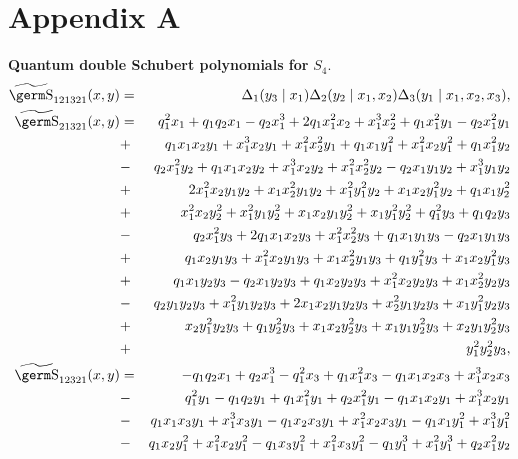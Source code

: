 {{\section*{Appendix A} 
{\large {\bf Quantum double Schubert polynomials for} $S_4.$ }
\begin{eqnarray*}
\wt{\s}_{121321}(x,y) & = & \Delta_1(y_3\mid x_1) \Delta_2(y_2\mid x_1,x_2) 
\Delta_3(y_1\mid x_1,x_2,x_3), \\ 
\wt{\s}_{21321}(x,y) & = & q_1^2 x_1 + q_1 q_2 x_1 - 
 q_2 x_1^3 + 2 q_1 x_1^2 x_2 + 
x_1^3 x_2^2 + q_1 x_1^2 y_1 - q_2 x_1^2 y_1  \\ 
 &+ &   q_1 x_1 x_2 y_1 + x_1^3 x_2 y_1 + 
 x_1^2 x_2^2 y_1 + q_1 x_1 y_1^2 + x_1^2 x_2 y_1^2 + 
 q_1 x_1^2 y_2 \\ 
 &- &  q_2 x_1^2 y_2 + 
 q_1 x_1 x_2 y_2 +  x_1^3 x_2 y_2 + x_1^2 x_2^2 y_2 - 
  q_2 x_1 y_1 y_2 + x_1^3 y_1 y_2\\ 
 &+ & 2 x_1^2 x_2 y_1 y_2 +  x_1 x_2^2 y_1 y_2 + x_1^2 y_1^2 y_2 + 
  x_1 x_2 y_1^2 y_2 + q_1 x_1 y_2^2\\ 
 &+ &  x_1^2 x_2 y_2^2 + x_1^2 y_1 y_2^2 + x_1 x_2 y_1 y_2^2 + 
 x_1 y_1^2 y_2^2 + q_1^2 y_3 + q_1 q_2 y_3 \\ 
 &- & q_2 x_1^2 y_3 + 2 q_1 x_1 x_2 y_3 + 
  x_1^2 x_2^2 y_3 + q_1 x_1 y_1 y_3 -q_2 x_1 y_1 y_3\\ 
 & +& q_1 x_2 y_1 y_3 + 
  x_1^2 x_2 y_1 y_3 + x_1 x_2^2 y_1 y_3 + 
  q_1 y_1^2 y_3 +x_1 x_2 y_1^2 y_3\\ 
 &+ & q_1 x_1 y_2 y_3 - q_2 x_1 y_2 y_3 + 
  q_1 x_2 y_2 y_3 + x_1^2 x_2 y_2 y_3 +x_1 x_2^2 y_2 y_3\\ 
 &- & q_2 y_1 y_2 y_3 + x_1^2 y_1 y_2 y_3 + 
  2 x_1 x_2 y_1 y_2 y_3 + x_2^2 y_1 y_2 y_3 + x_1 y_1^2 y_2 y_3 \\ 
 &+ & x_2 y_1^2 y_2 y_3 + q_1 y_2^2 y_3 + 
  x_1 x_2 y_2^2 y_3 + x_1 y_1 y_2^2 y_3 + x_2 y_1 y_2^2 y_3 \\ 
 &+ & y_1^2 y_2^2 y_3, \\ 
\wt{\s}_{12321}(x,y) & = & -q_1 q_2 x_1 + q_2 x_1^3 - 
q_1^2 x_3 + q_1 x_1^2 x_3 - q_1 x_1 x_2 x_3 + x_1^3 x_2 x_3\\ 
 &- & q_1^2 y_1 - q_1 q_2 y_1 + 
q_1 x_1^2 y_1 + q_2 x_1^2 y_1 - q_1 x_1 x_2 y_1 + 
   x_1^3 x_2 y_1\\ 
 &- & q_1 x_1 x_3 y_1 + x_1^3 x_3 y_1 - 
q_1 x_2 x_3 y_1 + x_1^2 x_2 x_3 y_1 - 
   q_1 x_1 y_1^2 + x_1^3 y_1^2\\ 
 &- & q_1 x_2 y_1^2 + 
x_1^2 x_2 y_1^2 - q_1 x_3 y_1^2 + 
   x_1^2 x_3 y_1^2 - q_1 y_1^3 + x_1^2 y_1^3 + 
q_2 x_1^2 y_2\\ 

\end{eqnarray*}}}
